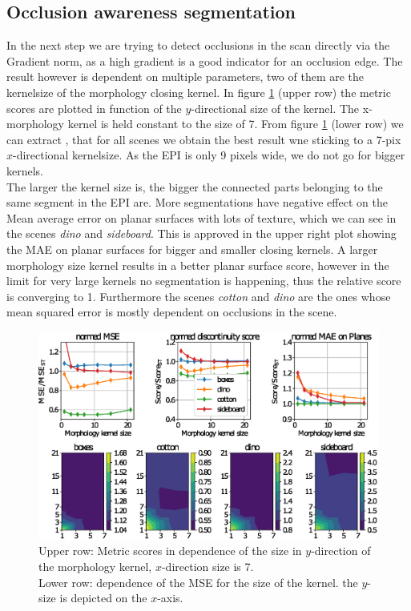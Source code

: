 \documentclass  [
  paper    = a4,
  BCOR     = 10mm,
  twoside,
  fontsize = 12pt,
  fleqn,
  toc      = bibnumbered,
  toc      = listofnumbered,
  numbers  = noendperiod,
  headings = normal,
  listof   = leveldown,
  version  = 3.03
]                                       {scrreprt}
\begin{document}
\subsection{Occlusion awareness segmentation}
\label{sec:occlusionawareness}
In the next step we are trying to detect occlusions in the scan directly via the Gradient norm, as a high gradient is a good indicator for an occlusion edge. The result however is dependent on multiple parameters, two of them are the kernelsize of the morphology closing kernel. In figure \ref{fig:threshsegmmorph} (upper row) the metric scores are plotted in function of the $y$-directional size of the kernel. The x-morphology kernel is held constant to the size of 7. From figure \ref{fig:threshsegmmorph} (lower row) we can extract , that for all scenes we obtain the best result wne sticking to a 7-pix $x$-directional kernelsize. As the EPI is only 9 pixels wide, we do not go for bigger kernels.\\
The larger the kernel size is, the bigger the connected parts belonging to the same segment in the EPI are. More segmentations have negative effect on the Mean average error on planar surfaces with lots of texture, which we can see in the scenes \textit{dino} and \textit{sideboard}. This is approved in the upper right plot showing the MAE on planar surfaces for bigger and smaller closing kernels. A larger morphology size kernel results in a better planar surface score, however in the limit for very large kernels no segmentation is happening, thus the relative score is converging to 1. Furthermore the scenes \textit{cotton} and \textit{dino} are the ones whose mean squared error is mostly dependent on occlusions in the scene. 
\begin{figure}
	\centering
	\includegraphics[width=1\linewidth]{images/thresh_segm_morph}
	\caption[Segmentation of Epi dependence on the morphology kernel]{Upper row: Metric scores in dependence of the size in $y$-direction of the morphology kernel, $x$-direction size is 7.\\ Lower row: dependence of the MSE for the size of the kernel. the $y$-size is depicted on the $x$-axis.}
	\label{fig:threshsegmmorph}
\end{figure}
\end{document}
